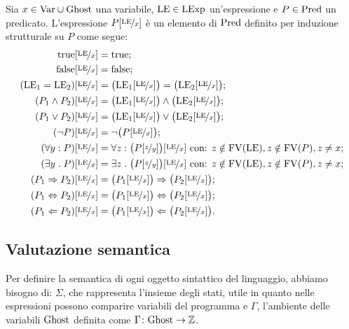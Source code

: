 \begin{definizione} 
Sia $x \in \mathrm{Var} \cup \mathrm{Ghost}$ una variabile, $\mathrm{LE} \in \mathrm{LExp}$ un'espressione
e $P \in \mathrm{Pred}$ un predicato.
L'espressione $P[\nicefrac{\mathrm{LE}}{x}]$ è un elemento di $\mathrm{Pred}$ definito
per induzione strutturale su $P$ come segue:
\begin{align*}
  \mathrm{true}[\nicefrac{\mathrm{LE}}{x}]
    &= \mathrm{true};\\
  \mathrm{false}[\nicefrac{\mathrm{LE}}{x}]
    &= \mathrm{false};\\
  (\mathrm{LE}_1 = \mathrm{LE}_2)[\nicefrac{\mathrm{LE}}{x}]
    &= \bigl(\mathrm{LE}_1[\nicefrac{\mathrm{LE}}{x}]\bigr) = \bigl(\mathrm{LE}_2[\nicefrac{\mathrm{LE}}{x}]\bigr);\\
  (P_1 \land P_2)[\nicefrac{\mathrm{LE}}{x}]
    &= \bigl(\mathrm{LE}_1[\nicefrac{\mathrm{LE}}{x}]\bigr) \land \bigl(\mathrm{LE}_2[\nicefrac{\mathrm{LE}}{x}]\bigr);\\
  (P_1 \lor P_2)[\nicefrac{\mathrm{LE}}{x}]
    &= \bigl(\mathrm{LE}_1[\nicefrac{\mathrm{LE}}{x}]\bigr) \lor \bigl(\mathrm{LE}_2[\nicefrac{\mathrm{LE}}{x}]\bigr);\\
  (\neg P)[\nicefrac{\mathrm{LE}}{x}]
    &= \neg \bigl(P [\nicefrac{\mathrm{LE}}{x}]\bigr);\\
  (\forall y\mathrel{:} P)[\nicefrac{\mathrm{LE}}{x}]
    &= \forall z\mathrel{:} \bigl(P [\nicefrac{z}{y}]\bigr)[\nicefrac{\mathrm{LE}}{x}] \text{ con: $z\notin\mathrm{FV}(\mathrm{LE}), z\notin\mathrm{FV}(P), z\neq x$};\\
  (\exists  y\mathrel{.} P)[\nicefrac{\mathrm{LE}}{x}]
    &= \exists z\mathrel{.} \bigl(P [\nicefrac{z}{y}]\bigr)[\nicefrac{\mathrm{LE}}{x}] \text{ con: $z\notin\mathrm{FV}(\mathrm{LE}), z\notin\mathrm{FV}(P), z\neq x$};\\
  (P_1 \Rightarrow P_2)[\nicefrac{\mathrm{LE}}{x}]
    &= \bigl(P_1[\nicefrac{\mathrm{LE}}{x}]\bigr) \Rightarrow \bigl(P_2[\nicefrac{\mathrm{LE}}{x}]\bigr);\\
  (P_1 \Leftrightarrow P_2)[\nicefrac{\mathrm{LE}}{x}]
    &= \bigl(P_1[\nicefrac{\mathrm{LE}}{x}]\bigr) \Leftrightarrow \bigl(P_2[\nicefrac{\mathrm{LE}}{x}]\bigr);\\
  (P_1 \Leftarrow P_2)[\nicefrac{\mathrm{LE}}{x}]
    &= \bigl(P_1[\nicefrac{\mathrm{LE}}{x}]\bigr) \Leftarrow \bigl(P_2[\nicefrac{\mathrm{LE}}{x}]\bigr).
\end{align*}
\end{definizione}

\subsection{Valutazione semantica}
Per definire la semantica di ogni oggetto sintattico del linguaggio, abbiamo bisogno di: $\Sigma$,
che rappresenta l'insieme degli stati, utile in quanto nelle espressioni possono comparire
variabili del programma e $\Gamma$, l'ambiente delle variabili $\mathrm{Ghost}$
definita come $\mathord{\Gamma}\colon\mathrm{Ghost}\to\mathbb{Z}$.

